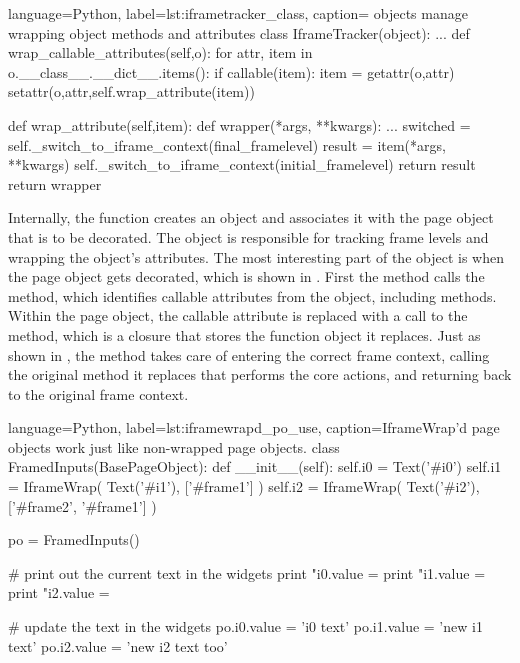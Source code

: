 \begin{xcode}{%
  language=Python,%
  label=lst:iframetracker_class,%
  caption={ objects manage wrapping object methods %
           and attributes}%
}
class IframeTracker(object):
    ...
    def wrap_callable_attributes(self,o):
        for attr, item in o.__class__.__dict__.items():
            if callable(item):
                item = getattr(o,attr)
                setattr(o,attr,self.wrap_attribute(item))

    def wrap_attribute(self,item):
        def wrapper(*args, **kwargs):
            ...
            switched = self._switch_to_iframe_context(final_framelevel)
            result = item(*args, **kwargs)
            self._switch_to_iframe_context(initial_framelevel)
            return result
        return wrapper
\end{xcode}



Internally, the  function creates an
 object and associates it with the page object that is
to be decorated. The  object is responsible for tracking
frame levels and wrapping the object's attributes.  The most interesting part
of the  object is when the page object gets decorated,
which is shown in .  First the
 method calls the
 method, which identifies callable
attributes from the object, including methods. Within the page object, the
callable attribute is replaced with a call to the  method,
which is a closure that stores the function object it replaces.  Just as shown
in , the  method takes
care of entering the correct frame context, calling the original method it
replaces that performs the core actions, and returning back to the original
frame context.


\begin{xcode}{%
  language=Python,%
  label=lst:iframewrapd_po_use,%
  caption={IframeWrap'd page objects work just like non-wrapped page objects.}%
}
class FramedInputs(BasePageObject):
    def __init__(self):
        self.i0 = Text('#i0')
        self.i1 = IframeWrap( Text('#i1'), ['#frame1'] )
        self.i2 = IframeWrap( Text('#i2'), ['#frame2', '#frame1'] )


po = FramedInputs()

# print out the current text in the widgets
print "i0.value = %
print "i1.value = %
print "i2.value = %

# update the text in the widgets
po.i0.value = 'i0 text'
po.i1.value = 'new i1 text'
po.i2.value = 'new i2 text too'
\end{xcode}


